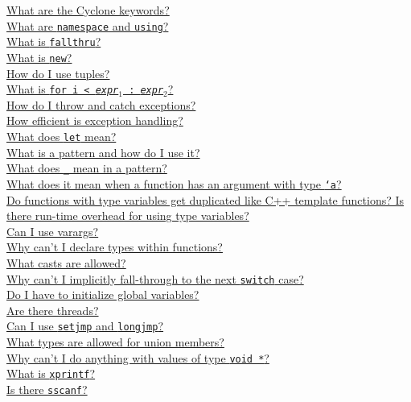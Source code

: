 \begin{small}
\hyperlink{faq:keywords}{What are the Cyclone keywords?}\\
\hyperlink{faq:namespace}{What are \texttt{namespace} and \texttt{using}?}\\
\hyperlink{faq:fallthru}{What is \texttt{fallthru}?}\\
\hyperlink{faq:new}{What is \texttt{new}?}\\
\hyperlink{faq:usetuples}{How do I use tuples?}\\
\hyperlink{faq:arrayinit}{What is \texttt{\lb for i < {\it expr}$_1$ : {\it expr}$_2$\rb}?}\\
\hyperlink{faq:exns}{How do I throw and catch exceptions?}\\
\hyperlink{faq:exn-efficiency}{How efficient is exception handling?}\\
\hyperlink{faq:let}{What does \texttt{let} mean?}\\
\hyperlink{faq:pattern}{What is a pattern and how do I use it?}\\
\hyperlink{faq:uscore-pattern}{What does \texttt{_} mean in a pattern?}\\
\hyperlink{faq:polymorphic}{What does it mean when a function has an argument with type \texttt{`a}?}\\
\hyperlink{faq:templates}{Do functions with type variables get duplicated like C++ template functions?  Is there run-time overhead for using type variables?}\\
\hyperlink{faq:vararg}{Can I use varargs?}\\
\hyperlink{faq:typesinfunctions}{Why can't I declare types within functions?}\\
\hyperlink{faq:casts}{What casts are allowed?}\\
\hyperlink{faq:implicitfallthru}{Why can't I implicitly fall-through to the next \texttt{switch} case?}\\
\hyperlink{faq:globalinit}{Do I have to initialize global variables?}\\
\hyperlink{faq:threads}{Are there threads?}\\
\hyperlink{faq:setjmp}{Can I use \texttt{setjmp} and \texttt{longjmp}?}\\
\hyperlink{faq:uniontypes}{What types are allowed for union members?}\\
\hyperlink{faq:voidstar2}{Why can't I do anything with values of type \texttt{void *}?}\\
\hyperlink{faq:xprintf}{What is \texttt{xprintf}?}\\
\hyperlink{faq:sscanf}{Is there \texttt{sscanf}?}\\

\end{small}
